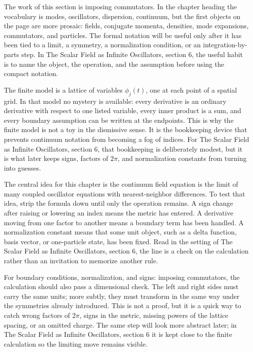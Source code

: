 The work of this section is imposing commutators.  In the chapter heading the vocabulary is modes, oscillators, dispersion, continuum, but the first objects on the page are more prosaic: fields, conjugate momenta, densities, mode expansions, commutators, and particles.  The formal notation will be useful only after it has been tied to a limit, a symmetry, a normalization condition, or an integration-by-parts step.  In The Scalar Field as Infinite Oscillators, section 6, the useful habit is to name the object, the operation, and the assumption before using the compact notation.

The finite model is a lattice of variables \(\phi_j(t)\), one at each point of a spatial grid.  In that model no mystery is available: every derivative is an ordinary derivative with respect to one listed variable, every inner product is a sum, and every boundary assumption can be written at the endpoints.  This is why the finite model is not a toy in the dismissive sense.  It is the bookkeeping device that prevents continuum notation from becoming a fog of indices.  For The Scalar Field as Infinite Oscillators, section 6, that bookkeeping is deliberately modest, but it is what later keeps signs, factors of \(2\pi\), and normalization constants from turning into guesses.

The central idea for this chapter is the continuum field equation is the limit of many coupled oscillator equations with nearest-neighbor differences.  To test that idea, strip the formula down until only the operation remains.  A sign change after raising or lowering an index means the metric has entered.  A derivative moving from one factor to another means a boundary term has been handled.  A normalization constant means that some unit object, such as a delta function, basis vector, or one-particle state, has been fixed.  Read in the setting of The Scalar Field as Infinite Oscillators, section 6, the line is a check on the calculation rather than an invitation to memorize another rule.

For boundary conditions, normalization, and signs: imposing commutators, the calculation should also pass a dimensional check.  The left and right sides must carry the same units; more subtly, they must transform in the same way under the symmetries already introduced.  This is not a proof, but it is a quick way to catch wrong factors of \(2\pi\), signs in the metric, missing powers of the lattice spacing, or an omitted charge.  The same step will look more abstract later; in The Scalar Field as Infinite Oscillators, section 6 it is kept close to the finite calculation so the limiting move remains visible.

